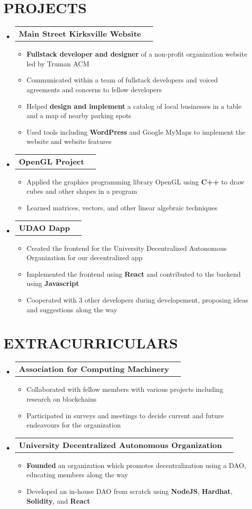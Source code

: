 \documentclass[letterpaper,11pt]{article}
\makeatletter
\newcommand{\resumeItem}[1]{
  \item\small{
    {#1 \vspace{-1pt}}
  }
}
\newcommand{\resumeProjectHeading}[2]{
    \item
    \begin{tabular*}{\textwidth}{l@{\extracolsep{\fill}}r}
      #1 & {\color{dark-grey}} \\
    \end{tabular*}\vspace{-7pt}
}
\newcommand{\resumeExtracurricularsHeading}[1]{
    \item
    \begin{tabular*}{\textwidth}{l@{\extracolsep{\fill}}r}
      #1 & {\color{dark-grey}} \\
    \end{tabular*}\vspace{-7pt}
}
\newcommand{\resumeSubHeadingListStart}{\begin{itemize}[leftmargin=0in, label={}]}
\newcommand{\resumeSubHeadingListEnd}{\end{itemize}}
\newcommand{\resumeItemListStart}{\begin{itemize}\setlength{\itemindent}{-1em}}
\newcommand{\resumeItemListEnd}{\end{itemize}\vspace{0pt}}
\makeatother
\begin{document}
\section{PROJECTS}
\resumeSubHeadingListStart
\resumeProjectHeading
{\textbf{Main Street Kirksville Website}} {Sept. 2019 -- Mar. 2021}
\resumeItemListStart
\resumeItem{\textbf{Fullstack developer and designer} of a non-profit organization website led by Truman ACM}
\resumeItem{Communicated within a team of fullstack developers and voiced agreements and concerns to fellow developers}
\resumeItem{Helped \textbf{design and implement} a catalog of local businesses in a table and a map of nearby parking spots}
\resumeItem{Used tools including \textbf{WordPress} and Google MyMaps to implement the website and website features}
\resumeItemListEnd
\resumeSubHeadingListEnd

\resumeSubHeadingListStart
\resumeProjectHeading
{\textbf{OpenGL Project}} {Sept. 2019 -- Mar. 2021}
\resumeItemListStart
\resumeItem{Applied the graphics programming library OpenGL using \textbf{C++} to draw cubes and other shapes in a program}
\resumeItem{Learned matrices, vectors, and other linear algebraic techniques}
\resumeItemListEnd
\resumeSubHeadingListEnd

\resumeSubHeadingListStart
\resumeProjectHeading
{\textbf{UDAO Dapp}} {Sept. 2019 -- Mar. 2021}
\resumeItemListStart
\resumeItem{Created the frontend for the University Decentralized Autonomous Organization for our decentralized app}
\resumeItem{Implemented the frontend using \textbf{React} and contributed to the backend using \textbf{Javascript}}
\resumeItem{Cooperated with 3 other developers during developement, proposing ideas and suggestions along the way}

\resumeItemListEnd
\resumeSubHeadingListEnd


\section{EXTRACURRICULARS}
\resumeSubHeadingListStart
\resumeExtracurricularsHeading
{\textbf{Association for Computing Machinery}}
\resumeItemListStart
\resumeItem{Collaborated with fellow members with various projects including research on blockchains}
\resumeItem{Participated in surveys and meetings to decide current and future endeavours for the organization}
\resumeItemListEnd
\resumeSubHeadingListEnd

\resumeSubHeadingListStart
\resumeExtracurricularsHeading
{\textbf{University Decentralized Autonomous Organization}}
\resumeItemListStart
\resumeItem{\textbf{Founded} an organization which promotes decentralization using a DAO, educating members along the way}
\resumeItem{Developed an in-house DAO from scratch using \textbf{NodeJS}, \textbf{Hardhat}, \textbf{Solidity}, and \textbf{React}}
\resumeItemListEnd
\resumeSubHeadingListEnd
\end{document}
